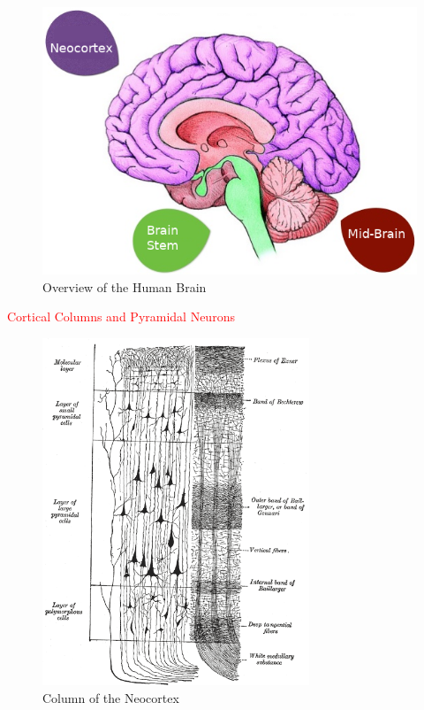 \documentclass[oneside,12pt,openany]{book}
\begin{document}
	\begin{figure}[h!]
		\centering
		\includegraphics[width=\linewidth]{images/Brain.png}
		\caption{Overview of the Human Brain}
		\label{fig:brain}
	\end{figure}
	
	\textcolor{red}{Cortical Columns and Pyramidal Neurons}
	
	
	
	\begin{figure}[h!]
		\centering
		\includegraphics[width=8cm]{images/ColumnOfNeocortex.png}
		\caption[Column of the Neocortex]{Column of the Neocortex\footnotemark}
		\label{CorticalColumn}
	\end{figure}
	
\end{document}
